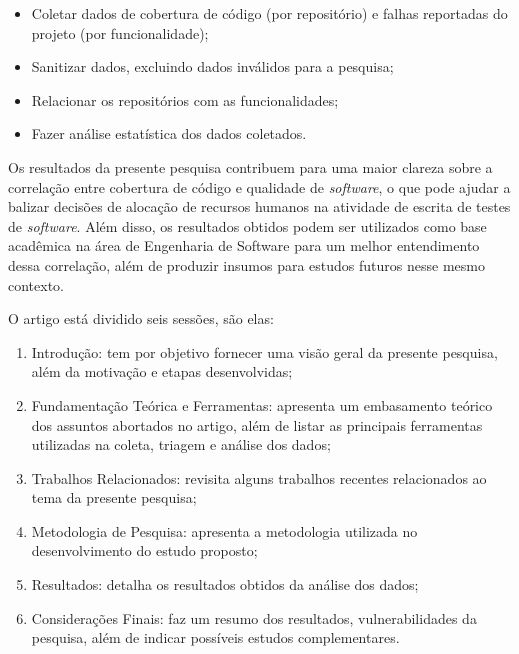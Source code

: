 \documentclass[11.5pt]{article}
\begin{document}
\begin{itemize}
    \item Coletar dados de cobertura de código (por repositório) e falhas reportadas do projeto (por
          funcionalidade);

    \item Sanitizar dados, excluindo dados inválidos para a pesquisa;

    \item Relacionar os repositórios com as funcionalidades;

    \item Fazer análise estatística dos dados coletados.
\end{itemize}

Os resultados da presente pesquisa contribuem para uma maior clareza sobre a correlação entre
cobertura de código e qualidade de \textit{software}, o que pode ajudar a balizar decisões de
alocação de recursos humanos na atividade de escrita de testes de \textit{software}.
Além disso, os resultados obtidos podem ser utilizados como base acadêmica na área de Engenharia de
Software para um melhor entendimento dessa correlação, além de produzir insumos para estudos futuros
nesse mesmo contexto.

O artigo está dividido seis sessões, são elas:
\begin{enumerate}
    \item Introdução: tem por objetivo fornecer uma visão geral da presente pesquisa, além da
          motivação e etapas desenvolvidas;

    \item Fundamentação Teórica e Ferramentas: apresenta um embasamento teórico dos assuntos
          abortados no artigo, além de listar as principais ferramentas utilizadas na coleta,
          triagem e análise dos dados;

    \item Trabalhos Relacionados: revisita alguns trabalhos recentes relacionados ao tema da
          presente pesquisa;

    \item Metodologia de Pesquisa: apresenta a metodologia utilizada no desenvolvimento do estudo
          proposto;

    \item Resultados: detalha os resultados obtidos da análise dos dados;

    \item Considerações Finais: faz um resumo dos resultados, vulnerabilidades da pesquisa, além de
          indicar possíveis estudos complementares.
\end{enumerate}
\end{document}
